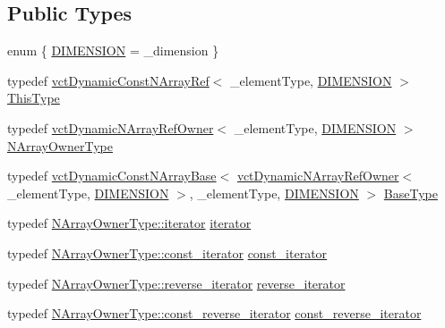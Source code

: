 \subsection*{Public Types}
\begin{DoxyCompactItemize}
\item 
enum \{ \hyperlink{group__cisst_vector_ggae8d52484153d181fd3ac08be58589848ae003ed9f88ed51f50c6c180506995b93}{D\+I\+M\+E\+N\+S\+I\+O\+N} = \+\_\+dimension
 \}
\item 
typedef \hyperlink{classvct_dynamic_const_n_array_ref}{vct\+Dynamic\+Const\+N\+Array\+Ref}$<$ \+\_\+element\+Type, \hyperlink{group__cisst_vector_ggae8d52484153d181fd3ac08be58589848ae003ed9f88ed51f50c6c180506995b93}{D\+I\+M\+E\+N\+S\+I\+O\+N} $>$ \hyperlink{classvct_dynamic_const_n_array_ref_aa156bc5f7cf482d155b45f75c59a3c72}{This\+Type}
\item 
typedef \hyperlink{classvct_dynamic_n_array_ref_owner}{vct\+Dynamic\+N\+Array\+Ref\+Owner}$<$ \+\_\+element\+Type, \hyperlink{group__cisst_vector_ggae8d52484153d181fd3ac08be58589848ae003ed9f88ed51f50c6c180506995b93}{D\+I\+M\+E\+N\+S\+I\+O\+N} $>$ \hyperlink{classvct_dynamic_const_n_array_ref_a0dc3cb1f3a96c6cf28da6084c4072151}{N\+Array\+Owner\+Type}
\item 
typedef \hyperlink{classvct_dynamic_const_n_array_base}{vct\+Dynamic\+Const\+N\+Array\+Base}$<$ \hyperlink{classvct_dynamic_n_array_ref_owner}{vct\+Dynamic\+N\+Array\+Ref\+Owner}$<$ \+\_\+element\+Type, \hyperlink{group__cisst_vector_ggae8d52484153d181fd3ac08be58589848ae003ed9f88ed51f50c6c180506995b93}{D\+I\+M\+E\+N\+S\+I\+O\+N} $>$, \+\_\+element\+Type, \hyperlink{group__cisst_vector_ggae8d52484153d181fd3ac08be58589848ae003ed9f88ed51f50c6c180506995b93}{D\+I\+M\+E\+N\+S\+I\+O\+N} $>$ \hyperlink{classvct_dynamic_const_n_array_ref_a8f6858abb088ed618d4cb4cea8309199}{Base\+Type}
\item 
typedef \hyperlink{classvct_dynamic_n_array_ref_owner_a9d68370074a5320a30354e700207ad71}{N\+Array\+Owner\+Type\+::iterator} \hyperlink{classvct_dynamic_const_n_array_ref_a29ec06cf468998d878719954c10bc973}{iterator}
\item 
typedef \hyperlink{classvct_dynamic_n_array_ref_owner_ab6652472746656a9be2de178295fd80b}{N\+Array\+Owner\+Type\+::const\+\_\+iterator} \hyperlink{classvct_dynamic_const_n_array_ref_a9787d4311b3672d3f5ef00f485441a39}{const\+\_\+iterator}
\item 
typedef \hyperlink{classvct_dynamic_n_array_ref_owner_aabd87b1efc3a18043c6dac3d8017be59}{N\+Array\+Owner\+Type\+::reverse\+\_\+iterator} \hyperlink{classvct_dynamic_const_n_array_ref_a5d4c22b61341f1d69f6bc0f7b176761b}{reverse\+\_\+iterator}
\item 
typedef \hyperlink{classvct_dynamic_n_array_ref_owner_ade444e0883b2420a8a113171b6e49bf4}{N\+Array\+Owner\+Type\+::const\+\_\+reverse\+\_\+iterator} \hyperlink{classvct_dynamic_const_n_array_ref_ac774d4a8e4c0f0a5caeab26c96531d96}{const\+\_\+reverse\+\_\+iterator}
\end{DoxyCompactItemize}
